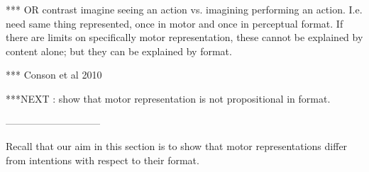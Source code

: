 \documentclass[12pt,\papersize]{extarticle}
\begin{document}
*** OR contrast imagine seeing an action vs. imagining performing an action. 
I.e. need same thing represented, once in motor and once in perceptual format.  If there are limits on specifically motor representation, these cannot be explained by content alone; but they can be explained by format.

*** Conson et al 2010


***NEXT : show that motor representation is not propositional in format.

-----------------------------

Recall that our aim in this section is to show that motor representations differ from intentions with respect to their format.  

\end{document}
